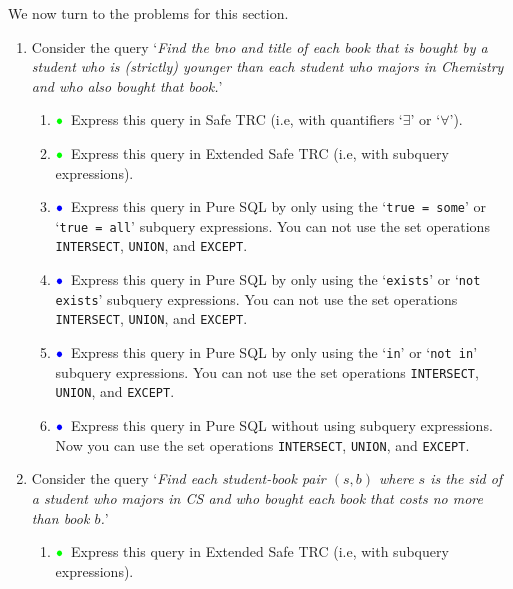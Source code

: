 \documentclass[11pt]{article}
\newcommand{\green}[1]{{\color{green}#1}}
\newcommand{\blue}[1]{{\color{blue}#1}}
\newcommand{\greenbullet}{$\green{\bullet}$}
\newcommand{\bluebullet}{$\blue{\bullet}$}
\begin{document}
\newpage
We now turn to the problems for this section.
\begin{enumerate}[resume]

\item \label{queryThree} Consider the query `\emph{Find the bno and title of each book that is bought by a student who
is (strictly) younger than each student who majors in Chemistry and
who also bought that book.}'

    \begin{enumerate}
    \item \greenbullet\  Express this query in Safe TRC (i.e, with quantifiers `$\exists$' or `$\forall$').
    

    \item \greenbullet\  Express this query in Extended Safe TRC (i.e, with subquery expressions).
    
    
    \item \bluebullet\ Express this query in Pure SQL by only using the `{\tt true = some}' or `{\tt true = all}' subquery expressions.
    You can not use the set operations {\tt INTERSECT}, {\tt UNION}, and {\tt EXCEPT}.
  
      \item  \bluebullet\  Express this query in Pure SQL by only using the `{\tt exists}' or `{\tt not exists}' subquery expressions.
    You can not use the set operations {\tt INTERSECT}, {\tt UNION}, and {\tt EXCEPT}.  
    
    \item  \bluebullet\  Express this query in Pure SQL by only using the `{\tt in}' or `{\tt not in}' subquery expressions.
    You can not use the set operations {\tt INTERSECT}, {\tt UNION}, and {\tt EXCEPT}.
    
    \item    \bluebullet\  Express this query in Pure SQL without using subquery expressions.
    Now you can use the set operations {\tt INTERSECT}, {\tt UNION}, and {\tt EXCEPT}.
    \end{enumerate}

\item \label{queryFour} Consider the query `\emph{Find each student-book pair $(s,b)$ where $s$ is the sid of a student who majors in CS and who bought each book that costs no more than book $b$.}'

    \begin{enumerate}
    \item \greenbullet\  Express this query in Extended Safe TRC (i.e, with subquery expressions).
    


\end{enumerate}
\end{enumerate}
\end{document}
